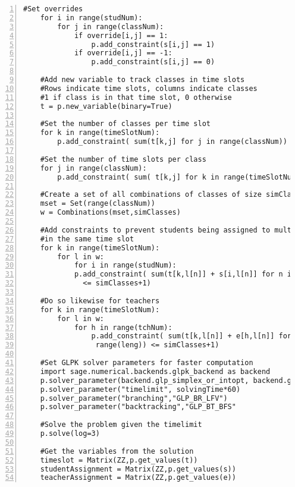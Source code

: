 \documentclass[11pt]{article}
\begin{document}
\begin{lstlisting}[numbers=left,numberstyle=\tiny,numbersep=0pt]
    #Set overrides    
    for i in range(studNum):
        for j in range(classNum):
            if override[i,j] == 1:
                p.add_constraint(s[i,j] == 1)
            if override[i,j] == -1:
                p.add_constraint(s[i,j] == 0)
                
    #Add new variable to track classes in time slots
    #Rows indicate time slots, columns indicate classes
    #1 if class is in that time slot, 0 otherwise            
    t = p.new_variable(binary=True)
    
    #Set the number of classes per time slot
    for k in range(timeSlotNum):
        p.add_constraint( sum(t[k,j] for j in range(classNum)) == simClasses)
    
    #Set the number of time slots per class    
    for j in range(classNum):
        p.add_constraint( sum( t[k,j] for k in range(timeSlotNum)) == 1)
    
    #Create a set of all combinations of classes of size simClassess    
    mset = Set(range(classNum))
    w = Combinations(mset,simClasses)
    
    #Add constraints to prevent students being assigned to multiple classes
    #in the same time slot
    for k in range(timeSlotNum):
        for l in w:
            for i in range(studNum):
            p.add_constraint( sum(t[k,l[n]] + s[i,l[n]] for n in range(leng))
              <= simClasses+1)
              
    #Do so likewise for teachers          
    for k in range(timeSlotNum):
        for l in w:
            for h in range(tchNum):
                p.add_constraint( sum(t[k,l[n]] + e[h,l[n]] for n in 
                 range(leng)) <= simClasses+1)
     
    #Set GLPK solver parameters for faster computation            
    import sage.numerical.backends.glpk_backend as backend
    p.solver_parameter(backend.glp_simplex_or_intopt, backend.glp_intopt_only)
    p.solver_parameter("timelimit", solvingTime*60)
    p.solver_parameter("branching","GLP_BR_LFV")
    p.solver_parameter("backtracking","GLP_BT_BFS"
    
    #Solve the problem given the timelimit
    p.solve(log=3)
    
    #Get the variables from the solution
    timeslot = Matrix(ZZ,p.get_values(t))
    studentAssignment = Matrix(ZZ,p.get_values(s))
    teacherAssignment = Matrix(ZZ,p.get_values(e))
\end{lstlisting}
\end{document}
